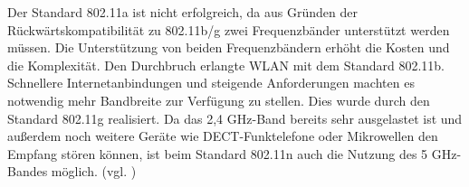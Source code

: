 \begin{table}[htb]
\centering
\caption{Übersicht der WLAN-Standards \cite{SWB-430171331}}
\label{tab:WLAN-Standards}
\end{table} 
\noindent
Der Standard 802.11a ist nicht erfolgreich, da aus Gründen der Rückwärtskompatibilität zu 802.11b/g zwei Frequenzbänder unterstützt werden müssen. Die Unterstützung von beiden Frequenzbändern erhöht die Kosten und die Komplexität. Den Durchbruch erlangte WLAN mit dem Standard 802.11b. Schnellere Internetanbindungen und steigende Anforderungen machten es notwendig mehr Bandbreite zur Verfügung zu stellen. Dies wurde durch den Standard 802.11g realisiert. Da das 2,4 GHz-Band bereits sehr ausgelastet ist und außerdem noch weitere Geräte wie DECT-Funktelefone oder Mikrowellen den Empfang stören können, ist beim Standard 802.11n auch die Nutzung des 5 GHz-Bandes möglich. (vgl. \cite{SWB-430171331})\\

